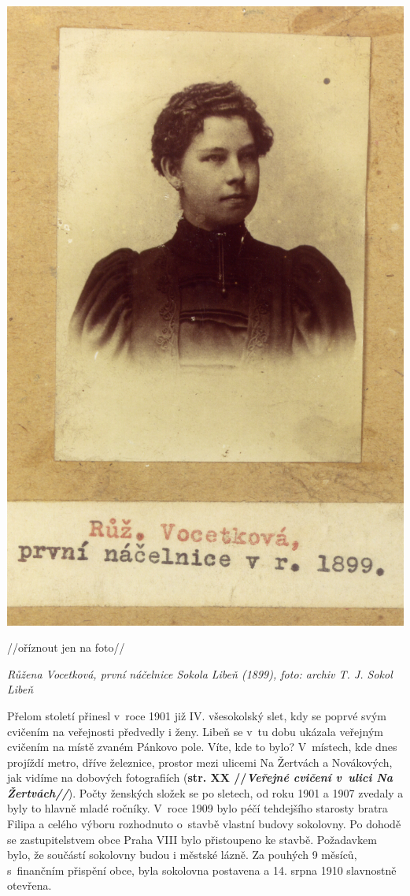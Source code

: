 \documentclass[a5paper, 11pt, twoside]{article}
\begin{document}
 \includegraphics[width=\textwidth]{img/34_vocetkova_nacelnice.jpg}

//oříznout jen na foto//

\textit{Růžena Vocetková, první náčelnice Sokola Libeň (1899), foto:
archiv T. J. Sokol Libeň}

Přelom století přinesl v~roce 1901 již IV. všesokolský slet, kdy se
poprvé svým cvičením na veřejnosti předvedly i ženy. Libeň se v~tu dobu
ukázala veřejným cvičením na místě zvaném Pánkovo pole. Víte, kde to
bylo? V~místech, kde dnes projíždí metro, dříve železnice, prostor mezi
ulicemi Na Žertvách a Novákových, jak vidíme na dobových fotografiích
(\textbf{str. XX //\textit{Veřejné cvičení v~ulici Na Žertvách//}}).
Počty ženských složek se po sletech, od roku 1901 a 1907 zvedaly a byly
to hlavně mladé ročníky. V~roce 1909 bylo péčí tehdejšího starosty
bratra Filipa a celého výboru rozhodnuto o~stavbě vlastní budovy
sokolovny. Po dohodě se zastupitelstvem obce Praha VIII bylo přistoupeno
ke stavbě. Požadavkem bylo, že součástí sokolovny budou i městské lázně.
Za pouhých 9 měsíců, s~finančním přispění obce, byla sokolovna postavena
a 14. srpna 1910 slavnostně otevřena.
\end{document}

